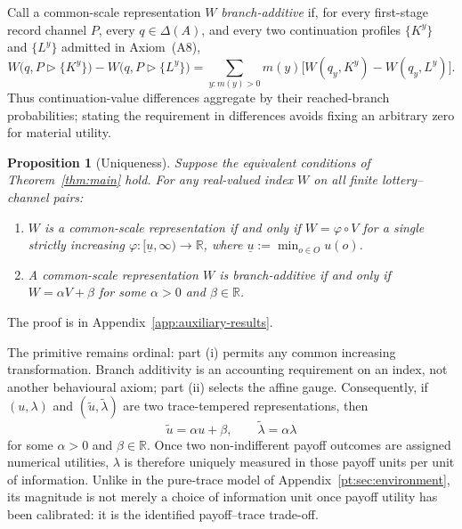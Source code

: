 \documentclass[11pt,a4paper]{article}
\newtheorem{proposition}[theorem]{Proposition}
\theoremstyle{definition}
\newcommand{\D}{\Delta}
\newcommand{\1}{\mathbf 1}
\begin{document}
Call a common-scale representation $W$ \emph{branch-additive} if, for every first-stage record channel $P$, every
$q\in\D(A)$, and every two continuation profiles $\{K^y\}$ and $\{L^y\}$ admitted in Axiom~\textup{(A8)},
\begin{equation}
 W\bigl(q,P\triangleright\{K^y\}\bigr)
 -W\bigl(q,P\triangleright\{L^y\}\bigr)
 =\sum_{y:m(y)>0}m(y)
 \bigl[W(q_y,K^y)-W(q_y,L^y)\bigr].
 \label{eq:branch-additive-index}
\end{equation}
Thus continuation-value differences aggregate by their reached-branch probabilities; stating the requirement in
differences avoids fixing an arbitrary zero for material utility.

\begin{proposition}[Uniqueness]\label{prop:uniqueness}
Suppose the equivalent conditions of Theorem~\ref{thm:main} hold.  For any real-valued index $W$ on all finite
lottery--channel pairs:
\begin{enumerate}[label=\textup{(\roman*)},leftmargin=*]
\item $W$ is a common-scale representation if and only if $W=\varphi\circ V$ for a single strictly increasing
$\varphi:[\underline u,\infty)\to\mathbb R$, where $\underline u:=\min_{o\in O}u(o)$.
\item A common-scale representation $W$ is branch-additive if and only if
$W=\alpha V+\beta$ for some $\alpha>0$ and $\beta\in\mathbb R$.
\end{enumerate}
\end{proposition}

The proof is in Appendix~\ref{app:auxiliary-results}.

The primitive remains ordinal: part \textup{(i)} permits any common increasing transformation.  Branch additivity is
an accounting requirement on an index, not another behavioural axiom; part \textup{(ii)} selects the affine gauge.
Consequently, if $(u,\lambda)$ and $(\widetilde u,\widetilde\lambda)$ are two trace-tempered representations, then
\[
 \widetilde u=\alpha u+\beta,
 \qquad
 \widetilde\lambda=\alpha\lambda
\]
for some $\alpha>0$ and $\beta\in\mathbb R$.  Once two non-indifferent payoff outcomes are assigned numerical utilities, $\lambda$ is
therefore uniquely measured in those payoff units per unit of information.  Unlike in the pure-trace model of
Appendix~\ref{pt:sec:environment}, its magnitude is not merely a choice of information unit once payoff utility
has been calibrated: it is the identified payoff--trace trade-off.
\end{document}
